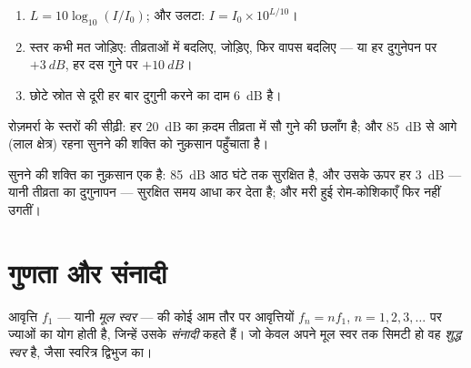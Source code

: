 \begin{method}[डेसिबल में काम करना]\label{met:g12:sound-acoustics:db}
\begin{enumerate}
  \item $L = 10\log_{10}(I/I_0)$; और उलटा: $I = I_0 \times 10^{L/10}$।
  \item स्तर कभी मत जोड़िए: तीव्रताओं में बदलिए, जोड़िए, फिर वापस बदलिए ---
        या हर दुगुनेपन पर $+\qty{3}{dB}$, हर दस गुने पर $+\qty{10}{dB}$।
  \item छोटे स्रोत से दूरी हर बार दुगुनी करने का दाम \qty{6}{dB} है।
\end{enumerate}
\end{method}

\begin{omfigure}

{\small रोज़मर्रा के स्तरों की सीढ़ी: हर \qty{20}{dB} का क़दम तीव्रता में सौ गुने की
छलाँग है; और \qty{85}{dB} से आगे (लाल क्षेत्र) रहना सुनने की शक्ति को नुक़सान
पहुँचाता है।}
\end{omfigure}

\begin{remark}[श्रवण-हानि]\label{rem:g12:sound-acoustics:damage}
सुनने की शक्ति का नुक़सान एक  है: \qty{85}{dB} आठ घंटे तक सुरक्षित
है, और उसके ऊपर हर \qty{3}{dB} --- यानी तीव्रता का दुगुनापन --- सुरक्षित समय आधा
कर देता है; और मरी हुई रोम-कोशिकाएँ फिर नहीं उगतीं।
\end{remark}

\section{गुणता और संनादी}

\begin{definition}[संनादी]\label{def:g12:sound-acoustics:harmonics}
आवृत्ति $f_1$ --- यानी \emph{मूल स्वर} --- की
कोई   आम तौर पर आवृत्तियों $f_n = n f_1$, $n = 1, 2, 3, \dots$ पर
ज्याओं का योग होती है, जिन्हें उसके \emph{संनादी} कहते हैं।
जो  केवल अपने मूल स्वर तक सिमटी हो वह \emph{शुद्ध
स्वर} है, जैसा स्वरित्र द्विभुज का।
\end{definition}

